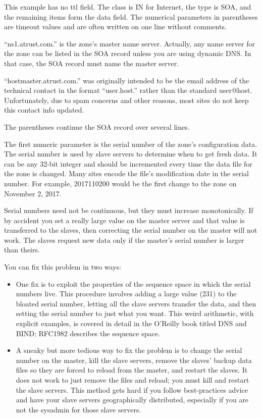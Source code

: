 This example has no {ttl} field. The class is IN for Internet, the type
is SOA, and the remaining items form the {data} field. The numerical
parameters in parentheses are timeout values and are often written on
one line without comments.

``ns1.atrust.com.'' is the zone's master name server. Actually, any name
server for the zone can be listed in the SOA record unless you are using
dynamic DNS. In that case, the SOA record must name the master server.

``hostmaster.atrust.com.'' was originally intended to be the email
address of the technical contact in the format ``{user.host.}'' rather
than the standard {user@host.} Unfortunately, due to spam concerns and
other reasons, most sites do not keep this contact info updated.

The parentheses continue the SOA record over several lines.

The first numeric parameter is the serial number of the zone's
configuration data. The serial number is used by slave servers to
determine when to get fresh data. It can be any 32-bit integer and
should be incremented every time the data file for the zone is changed.
Many sites encode the file's modification date in the serial number. For
example, 2017110200 would be the first change to the zone on November 2,
2017.

Serial numbers need not be continuous, but they must increase
monotonically. If by accident you set a really large value on the master
server and that value is transferred to the slaves, then correcting the
serial number on the master will not work. The slaves request new data
only if the master's serial number is larger than theirs.

You can fix this problem in two ways:

\begin{itemize}
\tightlist
\item
  One fix is to exploit the properties of the sequence space in which
  the serial numbers live. This procedure involves adding a large value
  (2{31}) to the bloated serial number, letting all the slave servers
  transfer the data, and then setting the serial number to just what you
  want. This weird arithmetic, with explicit examples, is covered in
  detail in the O'Reilly book titled {DNS and BIND}; RFC1982 describes
  the sequence space.
\item
  A sneaky but more tedious way to fix the problem is to change the
  serial number on the master, kill the slave servers, remove the
  slaves' backup data files so they are forced to reload from the
  master, and restart the slaves. It does not work to just remove the
  files and reload; you must kill and restart the slave servers. This
  method gets hard if you follow best-practices advice and have your
  slave servers geographically distributed, especially if you are not
  the sysadmin for those slave servers.
\end{itemize}

